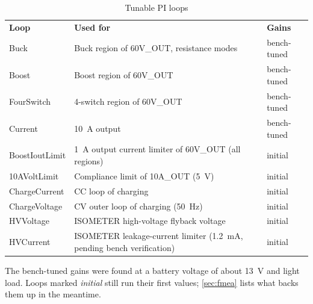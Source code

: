 \begin{table}[h!]
    \centering
    \begin{tabular}{p{3.5cm}p{7cm}p{2.5cm}}
        \rowcolor{gray} \textbf{Loop} & \textbf{Used for} & \textbf{Gains} \\
        Buck & Buck region of 60V\_OUT, resistance modes & bench-tuned \\
        Boost & Boost region of 60V\_OUT & bench-tuned \\
        FourSwitch & 4-switch region of 60V\_OUT & bench-tuned \\
        Current & \qty{10}{\ampere} output & bench-tuned \\
        BoostIoutLimit & \qty{1}{\ampere} output current limiter of 60V\_OUT (all regions) & initial \\
        10AVoltLimit & Compliance limit of 10A\_OUT (\qty{5}{\volt}) & initial \\
        ChargeCurrent & CC loop of charging & initial \\
        ChargeVoltage & CV outer loop of charging (\qty{50}{\hertz}) & initial \\
        HVVoltage & ISOMETER high-voltage flyback voltage & initial \\
        HVCurrent & ISOMETER leakage-current limiter (\qty{1.2}{\milli\ampere}, pending bench verification) & initial \\
    \end{tabular}
    \caption{Tunable PI loops}
\end{table}

The bench-tuned gains were found at a battery voltage of about
\qty{13}{\volt} and light load. Loops marked \emph{initial} still run their
first values; \autoref{sec:fmea} lists what backs them up in the meantime.

